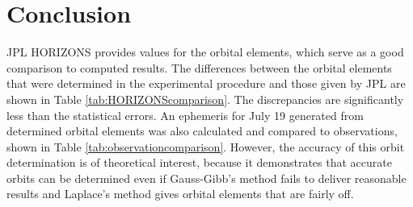 \documentclass[12pt,journal,compsoc]{IEEEtran}
\begin{document}
\begin{table}[!t]
\centering
{}
\caption{Comparison of JPL HORIZONS ephemeris of 1951 Lick and ephemeris from determined orbital elements with observation data\label{tab:observationcomparison}}
\end{table}

\section{Conclusion}
JPL HORIZONS provides values for the orbital elements, which serve as a good comparison to computed results.
The differences between the orbital elements that were determined in the experimental procedure and those given by JPL 
are shown in Table \ref{tab:HORIZONScomparison}.
The discrepancies are significantly less than the statistical errors. 
An ephemeris for July 19 generated from determined orbital elements was also calculated and compared to observations, 
shown in Table \ref{tab:observationcomparison}.
However, the accuracy of this orbit determination is of theoretical interest, because 
it demonstrates that accurate orbits can be determined even if Gauss-Gibb's method fails to 
deliver reasonable results and Laplace's method gives orbital elements that are fairly off.
\end{document}
